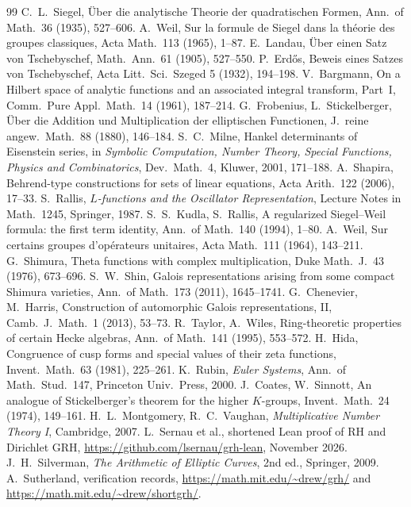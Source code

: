 \documentclass[11pt]{amsart}
\numberwithin{equation}{section}
\theoremstyle{definition}
\theoremstyle{remark}
\begin{document}
\begin{thebibliography}{99}
 C.~L.~Siegel, \"Uber die analytische Theorie der quadratischen Formen, Ann.\ of Math.\ 36 (1935), 527--606.
 A.~Weil, Sur la formule de Siegel dans la th\'eorie des groupes classiques, Acta Math.\ 113 (1965), 1--87.
 E.~Landau, \"Uber einen Satz von Tschebyschef, Math.\ Ann.\ 61 (1905), 527--550.
 P.~Erd\H os, Beweis eines Satzes von Tschebyschef, Acta Litt.\ Sci.\ Szeged 5 (1932), 194--198.
 V.~Bargmann, On a Hilbert space of analytic functions and an associated integral transform, Part~I, Comm.\ Pure Appl.\ Math.\ 14 (1961), 187--214.
 G.~Frobenius, L.~Stickelberger, \"Uber die Addition und Multiplication der elliptischen Functionen, J.\ reine angew.\ Math.\ 88 (1880), 146--184.
 S.~C.~Milne, Hankel determinants of Eisenstein series, in \emph{Symbolic Computation, Number Theory, Special Functions, Physics and Combinatorics}, Dev.\ Math.\ 4, Kluwer, 2001, 171--188.
 A.~Shapira, Behrend-type constructions for sets of linear equations, Acta Arith.\ 122 (2006), 17--33.
 S.~Rallis, \emph{$L$-functions and the Oscillator Representation}, Lecture Notes in Math.\ 1245, Springer, 1987.
 S.~S.~Kudla, S.~Rallis, A regularized Siegel--Weil formula: the first term identity, Ann.\ of Math.\ 140 (1994), 1--80.
 A.~Weil, Sur certains groupes d'op\'erateurs unitaires, Acta Math.\ 111 (1964), 143--211.
 G.~Shimura, Theta functions with complex multiplication, Duke Math.\ J.\ 43 (1976), 673--696.
 S.~W.~Shin, Galois representations arising from some compact Shimura varieties, Ann.\ of Math.\ 173 (2011), 1645--1741.
 G.~Chenevier, M.~Harris, Construction of automorphic Galois representations, II, Camb.\ J.\ Math.\ 1 (2013), 53--73.
 R.~Taylor, A.~Wiles, Ring-theoretic properties of certain Hecke algebras, Ann.\ of Math.\ 141 (1995), 553--572.
 H.~Hida, Congruence of cusp forms and special values of their zeta functions, Invent.\ Math.\ 63 (1981), 225--261.
 K.~Rubin, \emph{Euler Systems}, Ann.\ of Math.\ Stud.\ 147, Princeton Univ.\ Press, 2000.
 J.~Coates, W.~Sinnott, An analogue of Stickelberger's theorem for the higher $K$-groups, Invent.\ Math.\ 24 (1974), 149--161.
 H.~L.~Montgomery, R.~C.~Vaughan, \emph{Multiplicative Number Theory I}, Cambridge, 2007.
 L.~Sernau et al., shortened Lean proof of RH and Dirichlet GRH, \url{https://github.com/lsernau/grh-lean}, November 2026.
 J.~H.~Silverman, \emph{The Arithmetic of Elliptic Curves}, 2nd ed., Springer, 2009.
 A.~Sutherland, verification records, \url{https://math.mit.edu/~drew/grh/} and \url{https://math.mit.edu/~drew/shortgrh/}.
\end{thebibliography}
\end{document}
